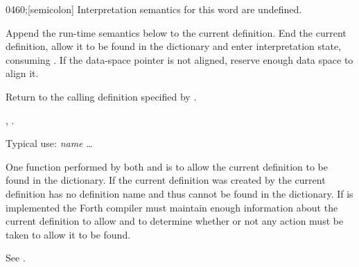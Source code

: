 \begin{worddef}{0460}{;}[semicolon]
\interpret
	Interpretation semantics for this word are undefined.

\compile

	Append the run-time semantics below to the current definition. End
	the current definition, allow it to be found in the dictionary and
	enter interpretation state, consuming . If the
	data-space pointer is not aligned, reserve enough data space to
	align it.

\runtime
	\stack{}{}

	Return to the calling definition specified by .

\see {},
	.

	\begin{defer}
	\rationale %
		Typical use:
			\word{:} \emph{name} {\ldots} \word{;}

		One function performed by both \word{;} and 
		is to allow the current definition to be found in the
		dictionary. If the current definition was created by
		 the current definition has no definition name
		and thus cannot be found in the dictionary. If 
		is implemented the Forth compiler must maintain enough
		information about the current definition to allow \word{;} and
		 to determine whether or not any action must
		be taken to allow it to be found.

	\testing*
		See .
	\end{defer}
\end{worddef}


